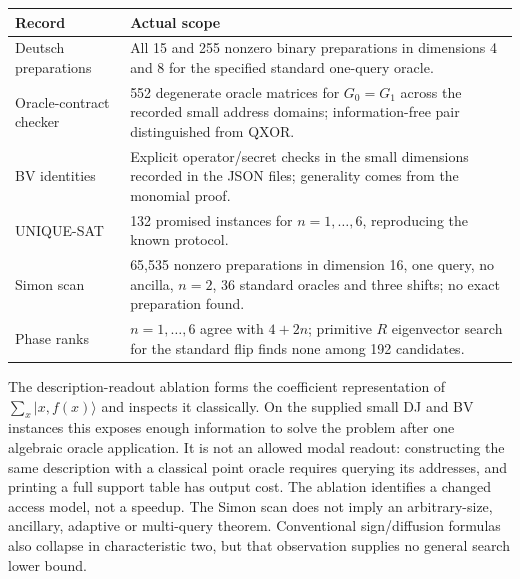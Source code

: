 \documentclass[11pt]{article}
\begin{document}
\begin{center}\small
\begin{tabular}{p{.27\linewidth}p{.63\linewidth}}
\toprule
Record & Actual scope\\\midrule
Deutsch preparations & All 15 and 255 nonzero binary preparations in dimensions 4 and 8 for the specified standard one-query oracle.\\
Oracle-contract checker & 552 degenerate oracle matrices for $G_0=G_1$ across the recorded small address domains; information-free pair distinguished from QXOR.\\
BV identities & Explicit operator/secret checks in the small dimensions recorded in the JSON files; generality comes from the monomial proof.\\
UNIQUE-SAT & 132 promised instances for $n=1,\ldots,6$, reproducing the known protocol.\\
Simon scan & 65,535 nonzero preparations in dimension 16, one query, no ancilla, $n=2$, 36 standard oracles and three shifts; no exact preparation found.\\
Phase ranks & $n=1,\ldots,6$ agree with $4+2n$; primitive $R$ eigenvector search for the standard flip finds none among 192 candidates.\\\bottomrule
\end{tabular}
\end{center}

The description-readout ablation forms the coefficient representation of $\sum_x|x,f(x)\rangle$ and inspects it classically. On the supplied small DJ and BV instances this exposes enough information to solve the problem after one algebraic oracle application. It is not an allowed modal readout: constructing the same description with a classical point oracle requires querying its addresses, and printing a full support table has output cost. The ablation identifies a changed access model, not a speedup. The Simon scan does not imply an arbitrary-size, ancillary, adaptive or multi-query theorem. Conventional sign/diffusion formulas also collapse in characteristic two, but that observation supplies no general search lower bound.

\clearpage
\end{document}
